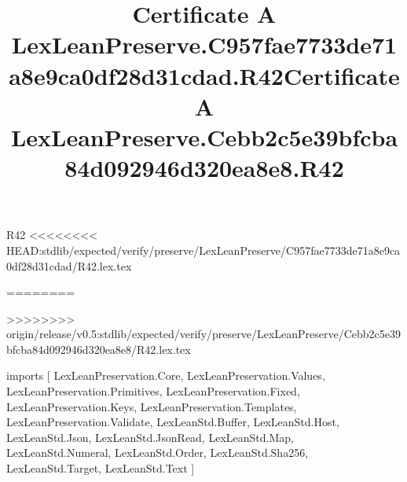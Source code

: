 \begin{lexlean}{R42}
<<<<<<<< HEAD:stdlib/expected/verify/preserve/LexLeanPreserve/C957fae7733de71a8e9ca0df28d31cdad/R42.lex.tex
\title{Certificate A LexLeanPreserve.C957fae7733de71a8e9ca0df28d31cdad.R42}
========
\title{Certificate A LexLeanPreserve.Cebb2c5e39bfcba84d092946d320ea8e8.R42}
>>>>>>>> origin/release/v0.5:stdlib/expected/verify/preserve/LexLeanPreserve/Cebb2c5e39bfcba84d092946d320ea8e8/R42.lex.tex
\begin{coremodule}
imports [
  LexLeanPreservation.Core,
  LexLeanPreservation.Values,
  LexLeanPreservation.Primitives,
  LexLeanPreservation.Fixed,
  LexLeanPreservation.Keys,
  LexLeanPreservation.Templates,
  LexLeanPreservation.Validate,
  LexLeanStd.Buffer,
  LexLeanStd.Host,
  LexLeanStd.Json,
  LexLeanStd.JsonRead,
  LexLeanStd.Map,
  LexLeanStd.Numeral,
  LexLeanStd.Order,
  LexLeanStd.Sha256,
  LexLeanStd.Target,
  LexLeanStd.Text
]


\end{coremodule}
\end{lexlean}
